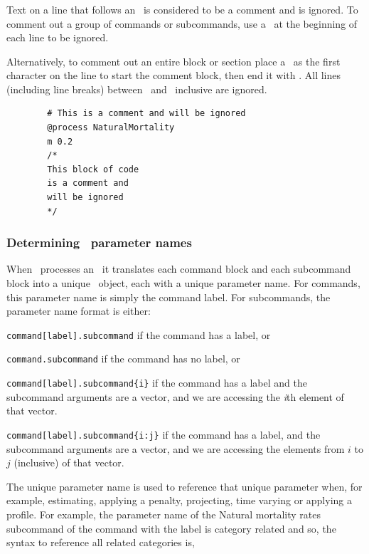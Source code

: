 \subsubsection{}
Text on a line that follows an \commentline\ is considered to be a comment and is ignored. To comment out a group of commands or subcommands, use a \commentline\ at the beginning of each line to be ignored.

Alternatively, to comment out an entire block or section place a \commentstart\ as the first character on the line to start the comment block, then end it with \commentend. All lines (including line breaks) between \commentstart\ and \commentend\ inclusive are ignored. 
{\small{\begin{verbatim}
		# This is a comment and will be ignored
		@process NaturalMortality
		m 0.2
		/* 
		This block of code 
		is a comment and
		will be ignored
		*/
		\end{verbatim}}}

\subsubsection{Determining \CNAME\ parameter names\label{sec:parameter-names}}

When \CNAME\ processes an \config\ it translates each command block and each subcommand block into a unique \CNAME\ object, each with a unique parameter name. For commands, this parameter name is simply the command label. For subcommands, the parameter name format is either: 

\begin{description}
\item \texttt{command[label].subcommand} if the command has a label, or
\item \texttt{command.subcommand} if the command has no label, or
\item \texttt{command[label].subcommand\{i\}} if the command has a label and the subcommand arguments are a vector, and we are accessing the  \emph{i}th element of that vector. 
\item \texttt{command[label].subcommand\{i:j\}} if the command has a label, and the subcommand arguments are a vector, and we are accessing the elements from $i$ to $j$ (inclusive) of that vector.
\end{description} 

The unique parameter name is used to reference that unique parameter when, for example, estimating, applying a penalty, projecting, time varying or applying a profile. For example, the parameter name of the Natural mortality rates subcommand  of the command  with the label  is category related and so, the syntax to reference all  related categories is, 

